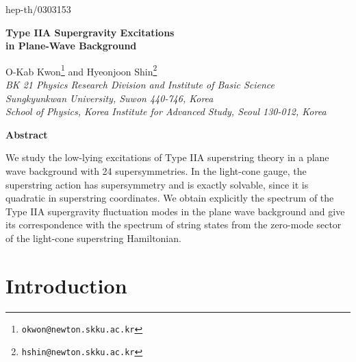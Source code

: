 \documentclass[a4paper,12pt]{article}
\numberwithin{equation}{section}
\begin{document}
\begin{titlepage}

\renewcommand{\thefootnote}{\fnsymbol{footnote}}

\hfill{hep-th/0303153}

\vspace{15mm}
\baselineskip 9mm
\begin{center}
{\LARGE \bf Type IIA Supergravity Excitations\\
in Plane-Wave Background}
\end{center}

\baselineskip 6mm
\vspace{10mm}
\begin{center}
  O-Kab Kwon\coordHE{}\footnote{\tt okwon@newton.skku.ac.kr} and
  Hyeonjoon Shin\coordHE{}\footnote{\tt hshin@newton.skku.ac.kr}
  \\[5mm]
  {\sl {}\coordHE{}BK 21 Physics Research Division and Institute of Basic
    Science \\ Sungkyunkwan University, Suwon 440-746, Korea \\
    \coordHE{}School of Physics, Korea Institute for Advanced Study, Seoul
    130-012, Korea }
\end{center}

\thispagestyle{empty}

\vfill
\begin{center}
{\bf Abstract}
\end{center}
\noindent
We study the low-lying excitations of Type IIA superstring theory in a
plane wave background with 24 supersymmetries.  In the light-cone
gauge, the superstring action has \coordHE{} supersymmetry and
is exactly solvable, since it is quadratic in superstring coordinates.
We obtain explicitly the spectrum of the Type IIA supergravity
fluctuation modes in the plane wave background and give its
correspondence with the spectrum of string states from the zero-mode
sector of the light-cone superstring Hamiltonian.

\vspace{20mm}
\end{titlepage}

\baselineskip 6.5mm
\renewcommand{\thefootnote}{\arabic{footnote}}
\setcounter{footnote}{0}

\section{Introduction}
\end{document}
